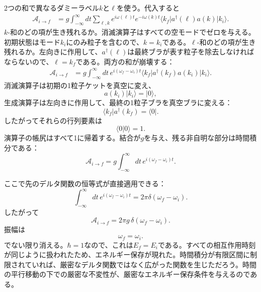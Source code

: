 2つの和で異なるダミーラベル\(k\)と\(\ell\)を使う。代入すると
\begin{align}
\mathcal A_{i\to f}
&=g\int_{-\infty}^{\infty}dt
\sum_{\ell,k}
e^{i\omega(\ell)t}e^{-i\omega(k)t}
\langle k_f\rvert a^\dagger(\ell)a(k)\lvert k_i\rangle.
\end{align}
\(k\)-和のどの項が生き残れるか。消滅演算子はすべての空モードでゼロを与える。初期状態はモード\(k_i\)にのみ粒子を含むので、\(k=k_i\)である。\(\ell\)-和のどの項が生き残れるか。左向きに作用して、\(a^\dagger(\ell)\)は最終ブラが表す粒子を除去しなければならないので、\(\ell=k_f\)である。両方の和が崩壊する：
\begin{align}
\mathcal A_{i\to f}
&=g\int_{-\infty}^{\infty}dt\,
e^{i(\omega_f-\omega_i)t}
\langle k_f\rvert a^\dagger(k_f)a(k_i)\lvert k_i\rangle.
\end{align}
消滅演算子は初期の1粒子ケットを真空に変え、
\begin{equation}
a(k_i)\lvert k_i\rangle=\lvert0\rangle,
\end{equation}
生成演算子は左向きに作用して、最終の1粒子ブラを真空ブラに変える：
\begin{equation}
\langle k_f\rvert a^\dagger(k_f)=\langle0\rvert.
\end{equation}
したがってそれらの行列要素は
\begin{equation}
\langle0\vert0\rangle=1.
\end{equation}
演算子の帳尻はすべて1に帰着する。結合が\(g\)を与え、残る非自明な部分は時間積分である：
\begin{equation}
\mathcal A_{i\to f}
=g\int_{-\infty}^{\infty}dt\,
e^{i(\omega_f-\omega_i)t}.
\end{equation}


ここで先のデルタ関数の恒等式が直接適用できる：
\begin{equation}
\int_{-\infty}^{\infty}dt\,
e^{i(\omega_f-\omega_i)t}
=2\pi\delta(\omega_f-\omega_i).
\end{equation}
したがって
\begin{equation}
\boxed{
\mathcal A_{i\to f}
=2\pi g\,\delta(\omega_f-\omega_i)
}.
\end{equation}
振幅は
\begin{equation}
\omega_f=\omega_i.
\end{equation}
でない限り消える。\(\hbar=1\)なので、これは\(E_f=E_i\)である。すべての相互作用時刻が同じように扱われたため、エネルギー保存が現れた。時間積分が有限区間に制限されていれば、厳密なデルタ関数ではなく広がった関数を生じただろう。時間の平行移動の下での厳密な不変性が、厳密なエネルギー保存条件を与えるのである。

